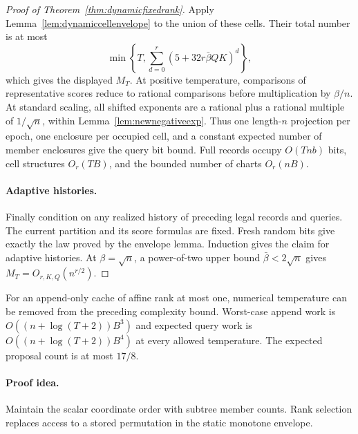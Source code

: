 \begin{proof}[Proof of Theorem~\ref{thm:dynamicfixedrank}]
Apply Lemma~\ref{lem:dynamiccellenvelope} to the union of these
cells.  Their total number is at most
\[
 \min\left\{T,\sum_{d=0}^r(5+32r\bar\beta QK)^d\right\},
\]
which gives the displayed $M_T$.  At positive temperature,
comparisons of representative scores reduce to rational
comparisons before multiplication by $\beta/n$.  At standard
scaling, all shifted exponents are a rational plus a rational
multiple of $1/\sqrt n$, within
Lemma~\ref{lem:newnegativeexp}.  Thus one length-$n$ projection
per epoch, one enclosure per occupied cell, and a constant
expected number of member enclosures give the query bit bound.
Full records occupy $O(Tnb)$ bits, cell structures $O_r(TB)$,
and the bounded number of charts $O_r(nB)$.

\paragraph{Adaptive histories.}
Finally condition on any realized history of preceding legal
records and queries.  The current partition and its score
formulas are fixed.  Fresh random bits give exactly the law
proved by the envelope lemma.  Induction gives the claim for
adaptive histories.  At $\beta=\sqrt n$, a power-of-two upper
bound $\bar\beta<2\sqrt n$ gives $M_T=O_{r,K,Q}(n^{r/2})$.
\end{proof}

\begin{corollary}
\label{cor:dynamicrankone}
For an append-only cache of affine rank at most one, numerical
temperature can be removed from the preceding complexity bound.
Worst-case append work is $O((n+\log(T+2))B^3)$ and expected
query work is $O((n+\log(T+2))B^4)$ at every allowed temperature.
The expected proposal count is at most $17/8$.
\end{corollary}

\paragraph{Proof idea.}
Maintain the scalar coordinate order with subtree member counts.
Rank selection replaces access to a stored permutation in the
static monotone envelope.

